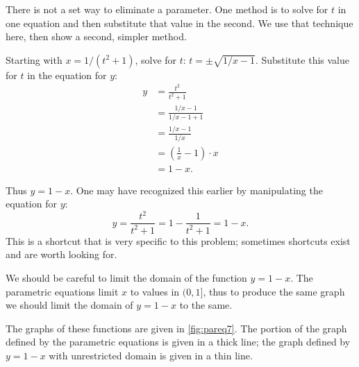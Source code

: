 {There is not a set way to eliminate a parameter. One method is to solve for $t$ in one equation and then substitute that value in the second. We use that technique here, then show a second, simpler method.

Starting with $x= 1/(t^2+1)$, solve for $t$: $ t = \pm\sqrt{1/x-1}$. Substitute this value for $t$ in the equation for $y$:
\begin{align*}
 y &= \frac{t^2}{t^2 +1} \\
		&= \frac{1/x-1}{1/x-1+1} \\
		&= \frac{1/x - 1}{1/x} \\
		&= \left(\frac1x-1\right)\cdot x \\
		&= 1-x.
\end{align*}


Thus $y=1-x$. One may have recognized this earlier by manipulating the equation for $y$:
\[y = \frac{t^2}{t^2+1} = 1-\frac{1}{t^2+1} = 1-x.\]
This is a shortcut that is very specific to this problem; sometimes shortcuts exist and are worth looking for.

We should be careful to limit the domain of the function $y=1-x$. The parametric equations limit $x$ to values in $(0,1]$, thus to produce the same graph we should limit the domain of $y=1-x$ to the same. 

The graphs of these functions are given in \autoref{fig:pareq7}. The portion of the graph defined by the parametric equations is given in a thick line; the graph defined by $y=1-x$ with unrestricted domain is given in a thin line.}

